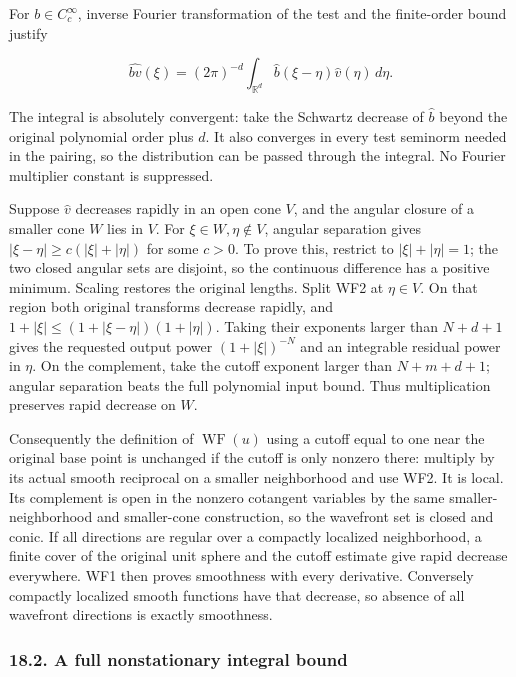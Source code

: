 \documentclass[
  11pt,
]{article}
\begin{document}
For \(b\in C_c^\infty\), inverse Fourier transformation of the test and
the finite-order bound justify

\[
\widehat{bv}(\xi)=(2\pi)^{-d}
       \int_{\mathbb R^d}\widehat b(\xi-\eta)\widehat v(\eta)\,d\eta.
\tag{WF2}
\]

The integral is absolutely convergent: take the Schwartz decrease of
\(\widehat b\) beyond the original polynomial order plus \(d\). It also
converges in every test seminorm needed in the pairing, so the
distribution can be passed through the integral. No Fourier multiplier
constant is suppressed.

Suppose \(\widehat v\) decreases rapidly in an open cone \(V\), and the
angular closure of a smaller cone \(W\) lies in \(V\). For
\(\xi\in W,\eta\notin V\), angular separation gives
\(|\xi-\eta|\geq c(|\xi|+|\eta|)\) for some \(c>0\). To prove this,
restrict to \(|\xi|+|\eta|=1\); the two closed angular sets are
disjoint, so the continuous difference has a positive minimum. Scaling
restores the original lengths. Split WF2 at \(\eta\in V\). On that
region both original transforms decrease rapidly, and
\(1+|\xi|\leq(1+|\xi-\eta|)(1+|\eta|)\). Taking their exponents larger
than \(N+d+1\) gives the requested output power \((1+|\xi|)^{-N}\) and
an integrable residual power in \(\eta\). On the complement, take the
cutoff exponent larger than \(N+m+d+1\); angular separation beats the
full polynomial input bound. Thus multiplication preserves rapid
decrease on \(W\).

Consequently the definition of \(\operatorname{WF}(u)\) using a cutoff
equal to one near the original base point is unchanged if the cutoff is
only nonzero there: multiply by its actual smooth reciprocal on a
smaller neighborhood and use WF2. It is local. Its complement is open in
the nonzero cotangent variables by the same smaller-neighborhood and
smaller-cone construction, so the wavefront set is closed and conic. If
all directions are regular over a compactly localized neighborhood, a
finite cover of the original unit sphere and the cutoff estimate give
rapid decrease everywhere. WF1 then proves smoothness with every
derivative. Conversely compactly localized smooth functions have that
decrease, so absence of all wavefront directions is exactly smoothness.

\subsubsection{18.2. A full nonstationary integral
bound}\label{a-full-nonstationary-integral-bound}
\end{document}
